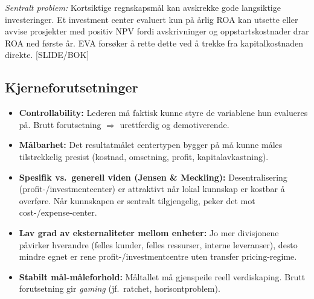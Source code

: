 \emph{Sentralt problem:} Kortsiktige regnskapsmål kan avskrekke gode langsiktige investeringer. Et investment center evaluert kun på årlig ROA kan utsette eller avvise prosjekter med positiv NPV fordi avskrivninger og oppstartskostnader drar ROA ned første år. EVA forsøker å rette dette ved å trekke fra kapitalkostnaden direkte. [SLIDE/BOK]

\subsection*{Kjerneforutsetninger}
\begin{itemize}
\item \textbf{Controllability:} Lederen må faktisk kunne styre de variablene hun evalueres på. Brutt forutsetning $\Rightarrow$ urettferdig og demotiverende.
\item \textbf{Målbarhet:} Det resultatmålet centertypen bygger på må kunne måles tilstrekkelig presist (kostnad, omsetning, profit, kapitalavkastning).
\item \textbf{Spesifik vs.\ generell viden (Jensen \& Meckling):} Desentralisering (profit-/investmentcenter) er attraktivt når lokal kunnskap er kostbar å overføre. Når kunnskapen er sentralt tilgjengelig, peker det mot cost-/expense-center.
\item \textbf{Lav grad av eksternaliteter mellom enheter:} Jo mer divisjonene påvirker hverandre (felles kunder, felles ressurser, interne leveranser), desto mindre egnet er rene profit-/investmentcentre uten transfer pricing-regime.
\item \textbf{Stabilt mål-måleforhold:} Måltallet må gjenspeile reell verdiskaping. Brutt forutsetning gir \emph{gaming} (jf.\ ratchet, horisontproblem).
\end{itemize}

